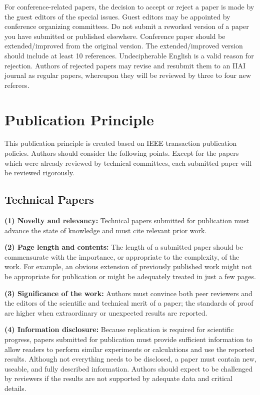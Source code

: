 \documentclass[11pt, onecolumn, twoside, a4paper]{article}
\begin{document}
For conference-related papers, the decision to accept or reject a paper is made by the guest editors of the special issues. Guest editors may be appointed by conference organizing committees. 
Do not submit a reworked version of a paper you have submitted or published elsewhere. 
Conference paper should be extended/improved from the original version. 
The extended/improved version should include at least 10 references. 
Undecipherable English is a valid reason for rejection. 
Authors of rejected papers may revise and resubmit them to an IIAI journal as regular papers, whereupon they will be reviewed by three to four new referees. 



\section{Publication Principle}

This publication principle is created based on IEEE transaction publication policies. 
Authors should consider the following points. 
Except for the papers which were already reviewed by technical committees, each submitted paper will be reviewed rigorously.

\subsection{Technical Papers}

\noindent
{\bf (1)  Novelty and relevancy:} Technical papers submitted for publication must advance the state of knowledge and must cite relevant prior work. 

\noindent
{\bf (2)  Page length and contents:} The length of a submitted paper should be commensurate with the importance, or appropriate to the complexity, of the work. For example, an obvious extension of previously published work might not be appropriate for publication or might be adequately treated in just a few pages.

\noindent
{\bf (3)  Significance of the work:} Authors must convince both peer reviewers and the editors of the scientific and technical merit of a paper; the standards of proof are higher when extraordinary or unexpected results are reported. 

\noindent
{\bf (4)  Information disclosure:} Because replication is required for scientific progress, papers submitted for publication must provide sufficient information to allow readers to perform similar experiments or calculations and use the reported results. Although not everything needs to be disclosed, a paper must contain new, useable, and fully described information. Authors should expect to be challenged by reviewers if the results are not supported by adequate data and critical details.
\end{document}
